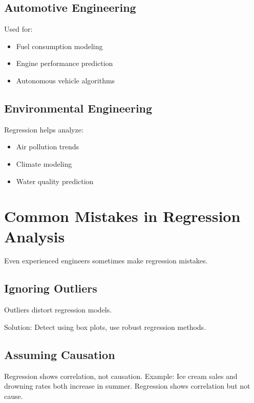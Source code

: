 \documentclass[12pt,a4paper]{article}
\begin{document}
	\subsection{Automotive Engineering}
	Used for:
	\begin{itemize}
		\item Fuel consumption modeling
		\item Engine performance prediction
		\item Autonomous vehicle algorithms
	\end{itemize}
	
	\subsection{Environmental Engineering}
	Regression helps analyze:
	\begin{itemize}
		\item Air pollution trends
		\item Climate modeling
		\item Water quality prediction
	\end{itemize}
	
	\section{Common Mistakes in Regression Analysis}
	Even experienced engineers sometimes make regression mistakes.
	
	\subsection{Ignoring Outliers}
	Outliers distort regression models.
	\begin{center}
	\end{center}
	Solution: Detect using box plots, use robust regression methods.
	
	\subsection{Assuming Causation}
	Regression shows correlation, not causation. Example: Ice cream sales and drowning rates both increase in summer. Regression shows correlation but not cause.
	
\end{document}
